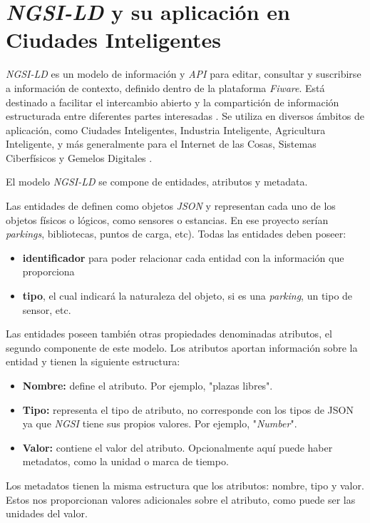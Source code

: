 \section{\textit{NGSI-LD} y su aplicación en Ciudades Inteligentes}\label{modelo-ngsi-ld}

\textit{NGSI-LD} es un modelo de información y \textit{API} para editar, consultar y suscribirse a información de contexto, definido dentro de la plataforma \textit{Fiware}.
Está destinado a facilitar el intercambio abierto y la compartición de información estructurada entre diferentes partes interesadas \cite{etsi_ngsi_ld}. Se utiliza en diversos ámbitos de aplicación, como Ciudades Inteligentes, Industria Inteligente, Agricultura Inteligente, y más generalmente para el Internet de las Cosas, Sistemas Ciberfísicos y Gemelos Digitales \cite{etsi_iot}.

El modelo \textit{NGSI-LD} se compone de entidades, atributos y metadata.

Las entidades de definen como objetos \textit{JSON} y representan cada uno de los objetos físicos o lógicos, como sensores o estancias. En ese proyecto serían \textit{parkings}, bibliotecas, puntos de carga, etc).
Todas las entidades deben poseer:
\begin{itemize}
    \item \textbf{identificador} para poder relacionar cada entidad con la información que proporciona
    \item \textbf{tipo}, el cual indicará la naturaleza del objeto, si es una \textit{parking}, un tipo de sensor, etc.
\end{itemize}

Las entidades poseen también otras propiedades denominadas atributos, el segundo componente de este modelo.
Los atributos aportan información sobre la entidad y tienen la siguiente estructura:
\begin{itemize}
    \item \textbf{Nombre:} define el atributo. Por ejemplo, "plazas libres".
    \item \textbf{Tipo:} representa el tipo de atributo, no corresponde con los tipos de JSON ya que \textit{NGSI} tiene sus propios valores. Por ejemplo, "\textit{Number}".
    \item \textbf{Valor:} contiene el valor del atributo. Opcionalmente aquí puede haber metadatos, como la unidad o marca de tiempo.
\end{itemize}

Los metadatos tienen la misma estructura que los atributos: nombre, tipo y valor. Estos nos proporcionan valores adicionales sobre el atributo, como puede ser las unidades del valor.

